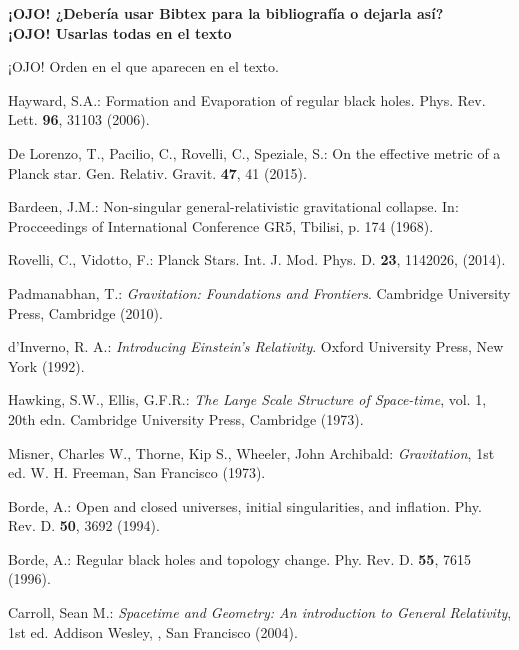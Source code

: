 \documentclass[prb,aps,preprintnumbers,amsmath,amssymb]{article}
\numberwithin{equation}{section}
\begin{document}
\begin{thebibliography}{10}

 \textbf{¡OJO! ¿Debería usar Bibtex para la bibliografía o dejarla así?}\\

 \textbf{¡OJO! Usarlas todas en el texto}

 ¡OJO! Orden en el que aparecen en el texto.

 Hayward, S.A.: Formation and Evaporation of regular black holes. Phys. Rev. Lett. \textbf{96}, 31103 (2006).

 De Lorenzo, T., Pacilio, C., Rovelli, C., Speziale, S.: On the effective metric of a Planck star. Gen. Relativ. Gravit. \textbf{47}, 41 (2015).

 Bardeen, J.M.: Non-singular general-relativistic gravitational collapse. In: Procceedings of International Conference GR5, Tbilisi, p. 174 (1968).

 Rovelli, C., Vidotto, F.: Planck Stars. Int. J. Mod. Phys. D. \textbf{23}, 1142026, (2014).


 Padmanabhan, T.: \textit{Gravitation: Foundations and Frontiers}. Cambridge University Press, Cambridge (2010).

 d'Inverno, R. A.: \textit{Introducing Einstein's Relativity}. Oxford University Press, New York (1992).

 Hawking, S.W., Ellis, G.F.R.: \textit{The Large Scale Structure of Space-time}, vol. 1, 20th edn. Cambridge University Press, Cambridge (1973).

 Misner, Charles W., Thorne, Kip S., Wheeler, John Archibald: \textit{Gravitation}, 1st ed. W. H. Freeman, San Francisco (1973).

 Borde, A.: Open and closed universes, initial singularities, and inflation. Phy. Rev. D. \textbf{50}, 3692 (1994).

 Borde, A.: Regular black holes and topology change. Phy. Rev. D. \textbf{55}, 7615 (1996).

 Carroll, Sean M.: \textit{Spacetime and Geometry: An introduction to General Relativity}, 1st ed. Addison Wesley, , San Francisco (2004). 

\end{thebibliography}
\end{document}
